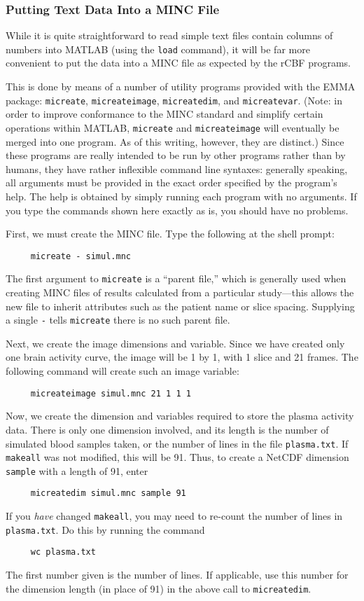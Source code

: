 \documentclass[11pt]{article}
\begin{document}
\subsubsection{Putting Text Data Into a MINC File}

While it is quite straightforward to read simple text files contain
columns of numbers into MATLAB (using the \verb|load| command), it
will be far more convenient to put the data into a MINC file as
expected by the rCBF programs.

This is done by means of a number of utility programs provided with
the EMMA package: \verb|micreate|, \verb|micreateimage|,
\verb|micreatedim|, and \verb|micreatevar|.  (Note: in order to
improve conformance to the MINC standard and simplify certain
operations within MATLAB, \verb|micreate| and \verb|micreateimage|
will eventually be merged into one program.  As of this writing,
however, they are distinct.)  Since these programs are really intended
to be run by other programs rather than by humans, they have rather
inflexible command line syntaxes: generally speaking, all arguments
must be provided in the exact order specified by the program's help.
The help is obtained by simply running each program with no arguments.
If you type the commands shown here exactly as is, you should have no
problems.

First, we must create the MINC file.  Type the following at the shell
prompt:
\begin{verbatim}
     micreate - simul.mnc
\end{verbatim}
The first argument to \verb|micreate| is a ``parent file,'' which is
generally used when creating MINC files of results calculated from a
particular study---this allows the new file to inherit attributes such
as the patient name or slice spacing.  Supplying a single \verb|-|
tells \verb|micreate| there is no such parent file.

Next, we create the image dimensions and variable.  Since we have
created only one brain activity curve, the image will be 1 by 1, with
1 slice and 21 frames.  The following command will create such an
image variable:
\begin{verbatim}
     micreateimage simul.mnc 21 1 1 1
\end{verbatim}

Now, we create the dimension and variables required to store the
plasma activity data.  There is only one dimension involved, and its
length is the number of simulated blood samples taken, or the number
of lines in the file \verb|plasma.txt|.  If \verb|makeall| was not
modified, this will be 91.  Thus, to create a NetCDF dimension
\verb|sample| with a length of 91, enter
\begin{verbatim}
     micreatedim simul.mnc sample 91
\end{verbatim}
If you {\em have} changed \verb|makeall|, you may need to re-count the
number of lines in \verb|plasma.txt|.  Do this by running the command
\begin{verbatim}
     wc plasma.txt
\end{verbatim}
The first number given is the number of lines.  If applicable, use
this number for the dimension length (in place of 91) in the above
call to \verb|micreatedim|.
\end{document}
